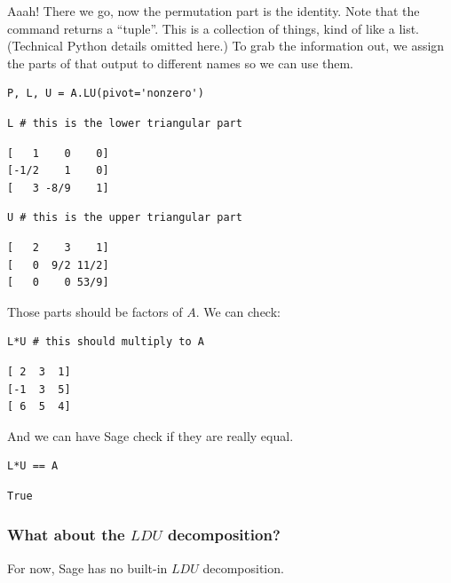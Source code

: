 \documentclass[10pt,]{book}
\theoremstyle{plain}
\theoremstyle{definition}
\numberwithin{equation}{section}
\begin{document}
        Aaah! There we go, now the permutation part is the identity. Note that
        the command returns a ``tuple''. This is a collection of things,
        kind of like a list. (Technical Python details omitted here.)
        To grab the information out, we assign the parts of that output to different
        names so we can use them.
\begin{lstlisting}[style=sageinput]
P, L, U = A.LU(pivot='nonzero')
\end{lstlisting}
\begin{lstlisting}[style=sageinput]
L # this is the lower triangular part
\end{lstlisting}
\begin{lstlisting}[style=sageoutput]
[   1    0    0]
[-1/2    1    0]
[   3 -8/9    1]
\end{lstlisting}
\begin{lstlisting}[style=sageinput]
U # this is the upper triangular part
\end{lstlisting}
\begin{lstlisting}[style=sageoutput]
[   2    3    1]
[   0  9/2 11/2]
[   0    0 53/9]
\end{lstlisting}
\par

        Those parts should be factors of \(A\). We can check:
\begin{lstlisting}[style=sageinput]
L*U # this should multiply to A
\end{lstlisting}
\begin{lstlisting}[style=sageoutput]
[ 2  3  1]
[-1  3  5]
[ 6  5  4]
\end{lstlisting}
\par

        And we can have Sage check if they are really equal.
\begin{lstlisting}[style=sageinput]
L*U == A
\end{lstlisting}
\begin{lstlisting}[style=sageoutput]
True
\end{lstlisting}
\typeout{************************************************}
\typeout{************************************************}
\subsubsection[What about the \(LDU\) decomposition?]{What about the \(LDU\) decomposition?}\label{subsubsection-27}
For now, Sage has no built-in \(LDU\) decomposition.%
\typeout{************************************************}
\typeout{************************************************}
\end{document}
